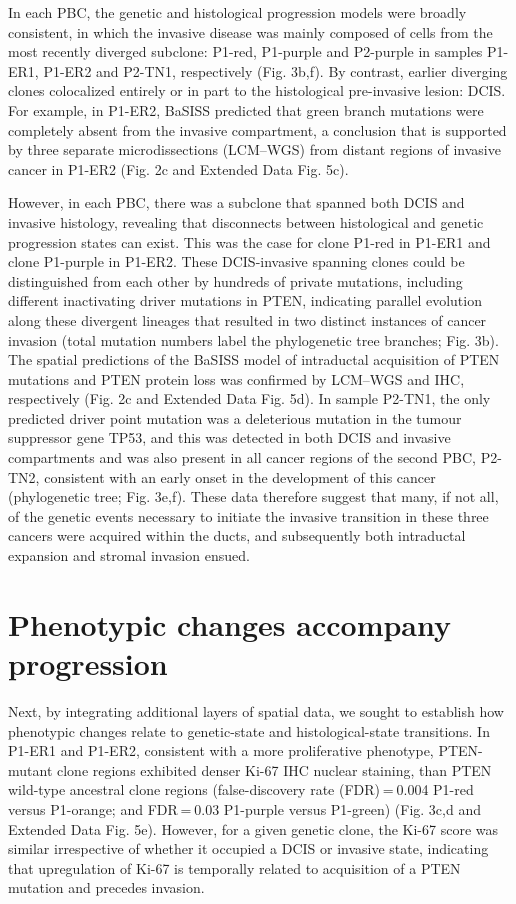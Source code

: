 In each PBC, the genetic and histological progression models were broadly consistent, in which the invasive disease was mainly composed of cells from the most recently diverged subclone: P1-red, P1-purple and P2-purple in samples P1-ER1, P1-ER2 and P2-TN1, respectively (Fig. 3b,f). By contrast, earlier diverging clones colocalized entirely or in part to the histological pre-invasive lesion: DCIS. For example, in P1-ER2, BaSISS predicted that green branch mutations were completely absent from the invasive compartment, a conclusion that is supported by three separate microdissections (LCM–WGS) from distant regions of invasive cancer in P1-ER2 (Fig. 2c and Extended Data Fig. 5c).

However, in each PBC, there was a subclone that spanned both DCIS and invasive histology, revealing that disconnects between histological and genetic progression states can exist. This was the case for clone P1-red in P1-ER1 and clone P1-purple in P1-ER2. These DCIS-invasive spanning clones could be distinguished from each other by hundreds of private mutations, including different inactivating driver mutations in PTEN, indicating parallel evolution along these divergent lineages that resulted in two distinct instances of cancer invasion (total mutation numbers label the phylogenetic tree branches; Fig. 3b). The spatial predictions of the BaSISS model of intraductal acquisition of PTEN mutations and PTEN protein loss was confirmed by LCM–WGS and IHC, respectively (Fig. 2c and Extended Data Fig. 5d). In sample P2-TN1, the only predicted driver point mutation was a deleterious mutation in the tumour suppressor gene TP53, and this was detected in both DCIS and invasive compartments and was also present in all cancer regions of the second PBC, P2-TN2, consistent with an early onset in the development of this cancer (phylogenetic tree; Fig. 3e,f). These data therefore suggest that many, if not all, of the genetic events necessary to initiate the invasive transition in these three cancers were acquired within the ducts, and subsequently both intraductal expansion and stromal invasion ensued.

\section{Phenotypic changes accompany progression}

Next, by integrating additional layers of spatial data, we sought to establish how phenotypic changes relate to genetic-state and histological-state transitions. In P1-ER1 and P1-ER2, consistent with a more proliferative phenotype, PTEN-mutant clone regions exhibited denser Ki-67 IHC nuclear staining, than PTEN wild-type ancestral clone regions (false-discovery rate (FDR) = 0.004 P1-red versus P1-orange; and FDR = 0.03 P1-purple versus P1-green) (Fig. 3c,d and Extended Data Fig. 5e). However, for a given genetic clone, the Ki-67 score was similar irrespective of whether it occupied a DCIS or invasive state, indicating that upregulation of Ki-67 is temporally related to acquisition of a PTEN mutation and precedes invasion.

